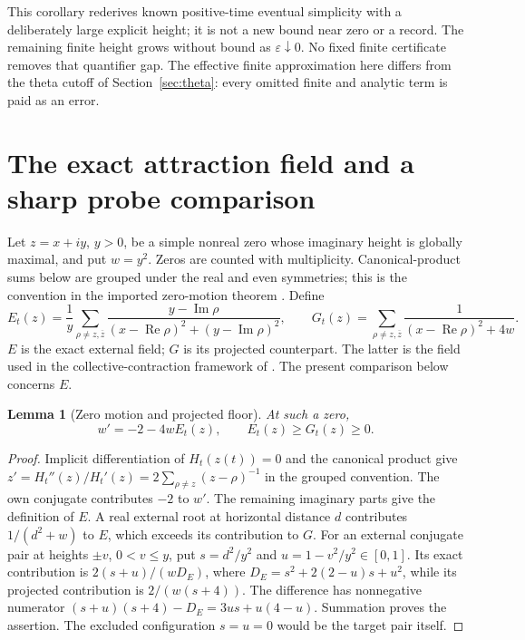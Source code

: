 \documentclass[11pt]{article}
\numberwithin{equation}{section}
\newtheorem{lemma}[theorem]{Lemma}
\theoremstyle{definition}
\theoremstyle{remark}
\DeclareMathOperator{\Rea}{Re}
\DeclareMathOperator{\Ima}{Im}
\begin{document}
This corollary rederives known positive-time eventual simplicity with
a deliberately large explicit height; it is not a new bound near zero
or a record. The remaining finite height grows without bound as
$\varepsilon\downarrow0$. No fixed finite certificate removes that
quantifier gap. The effective finite approximation here differs from
the theta cutoff of Section~\ref{sec:theta}: every omitted finite and
analytic term is paid as an error.

\section{The exact attraction field and a sharp probe comparison}
\label{sec:field}
Let $z=x+iy$, $y>0$, be a simple nonreal zero whose imaginary height
is globally maximal, and put $w=y^2$. Zeros are counted with multiplicity.
Canonical-product sums below are grouped under the real and even
symmetries; this is the convention in the imported zero-motion theorem
\cite[Proposition~3.1]{polymath}. Define
\begin{equation}\label{eq:fields}
 E_t(z)=\frac1y\sum_{\rho\ne z,\overline z}
 \frac{y-\Ima\rho}{(x-\Rea\rho)^2+(y-\Ima\rho)^2},
 \qquad
 G_t(z)=\sum_{\rho\ne z,\overline z}
 \frac1{(x-\Rea\rho)^2+4w}.
\end{equation}
$E$ is the exact external field; $G$ is its projected counterpart.
The latter is the field used in the collective-contraction framework
of \cite[Section~2]{planat}. The present comparison below concerns $E$.

\begin{lemma}[Zero motion and projected floor]\label{lem:motion}
At such a zero,
\begin{equation}\label{eq:motion}
 w'=-2-4wE_t(z),\qquad E_t(z)\ge G_t(z)\ge0.
\end{equation}
\end{lemma}
\begin{proof}
Implicit differentiation of $H_t(z(t))=0$ and the canonical product
give $z'=H_t''(z)/H_t'(z)=2\sum_{\rho\ne z}(z-\rho)^{-1}$ in
the grouped convention. The own conjugate contributes $-2$ to $w'$.
The remaining imaginary parts give the definition of $E$.
A real external root at horizontal distance $d$ contributes
$1/(d^2+w)$ to $E$, which exceeds its contribution to $G$.
For an external conjugate pair at heights $\pm v$, $0<v\le y$,
put $s=d^2/y^2$ and $u=1-v^2/y^2\in[0,1]$. Its exact contribution
is $2(s+u)/(wD_E)$, where
$D_E=s^2+2(2-u)s+u^2$, while its projected contribution is
$2/(w(s+4))$. The difference has nonnegative numerator
$(s+u)(s+4)-D_E=3us+u(4-u)$. Summation proves the assertion.
The excluded configuration $s=u=0$ would be the target pair itself.
\end{proof}
\end{document}
